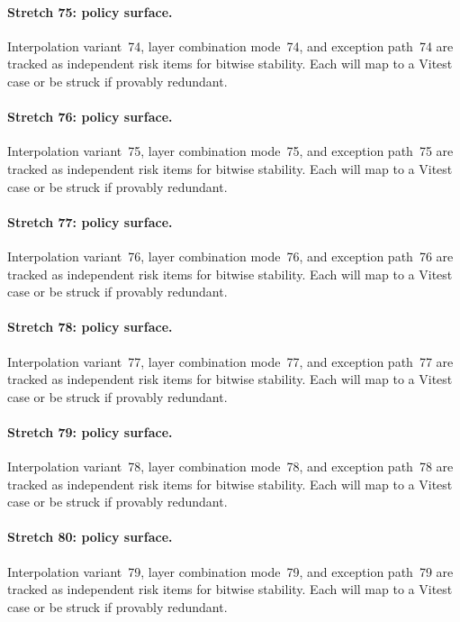 \documentclass[sigconf,nonacm]{acmart}
\begin{document}
\paragraph{Stretch 75: policy surface.}
Interpolation variant~74, layer combination mode~74, and exception path~74 are tracked as independent risk items for bitwise stability. Each will map to a Vitest case or be struck if provably redundant. %

\paragraph{Stretch 76: policy surface.}
Interpolation variant~75, layer combination mode~75, and exception path~75 are tracked as independent risk items for bitwise stability. Each will map to a Vitest case or be struck if provably redundant. %

\paragraph{Stretch 77: policy surface.}
Interpolation variant~76, layer combination mode~76, and exception path~76 are tracked as independent risk items for bitwise stability. Each will map to a Vitest case or be struck if provably redundant. %

\paragraph{Stretch 78: policy surface.}
Interpolation variant~77, layer combination mode~77, and exception path~77 are tracked as independent risk items for bitwise stability. Each will map to a Vitest case or be struck if provably redundant. %

\paragraph{Stretch 79: policy surface.}
Interpolation variant~78, layer combination mode~78, and exception path~78 are tracked as independent risk items for bitwise stability. Each will map to a Vitest case or be struck if provably redundant. %

\paragraph{Stretch 80: policy surface.}
Interpolation variant~79, layer combination mode~79, and exception path~79 are tracked as independent risk items for bitwise stability. Each will map to a Vitest case or be struck if provably redundant. %
\end{document}
